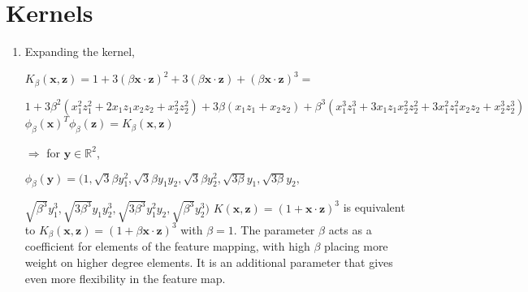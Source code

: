 \documentclass[11pt]{article}
\begin{document}
\section{Kernels}
\begin{enumerate}
\item
Expanding the kernel,

$K_\beta(\textbf{x}, \textbf{z}) = 1 + 3(\beta\textbf{x} \cdotp \textbf{z})^2 + 3(\beta\textbf{x} \cdot \textbf{z}) + (\beta\textbf{x} \cdot \textbf{z})^3 =$


$1 + 3\beta^2(x_1^2z_1^2+2x_1z_1x_2z_2+x_2^2z_2^2) + 3\beta(x_1z_1+x_2z_2)+\beta^3(x_1^3z_1^3+3x_1z_1x_2^2z_2^2+3x_1^2z_1^2x_2z_2+x_2^3z_2^3)$
\newline \newline
$\phi_\beta(\textbf{x})^T\phi_\beta(\textbf{z}) = K_\beta(\textbf{x}, \textbf{z})$

$\Rightarrow$ for $\textbf{y} \in \mathbb{R}^2$,

$\phi_\beta(\textbf{y}) = (1, \sqrt{3}\beta y_1^2, \sqrt{3}\beta y_1y_2, \sqrt{3}\beta y_2^2, \sqrt{3\beta}y_1, \sqrt{3\beta}y_2,$

\hspace{1.5cm} $\sqrt{\beta^3}y_1^3, \sqrt{3\beta^3}y_1y_2^3, \sqrt{3\beta^3}y_1^2y_2, \sqrt{\beta^3}y_2^3)$
\newline \newline \newline
$K(\textbf{x}, \textbf{z}) = (1 + \textbf{x} \cdotp \textbf{z})^3$ is equivalent to $K_\beta(\textbf{x}, \textbf{z}) = (1 + \beta \textbf{x} \cdotp \textbf{z})^3$ with $\beta = 1$. The parameter $\beta$ acts as a coefficient for elements of the feature mapping, with high $\beta$ placing more weight on higher degree elements. It is an additional parameter that gives even more flexibility in the feature map.
\end{enumerate}
\end{document}
